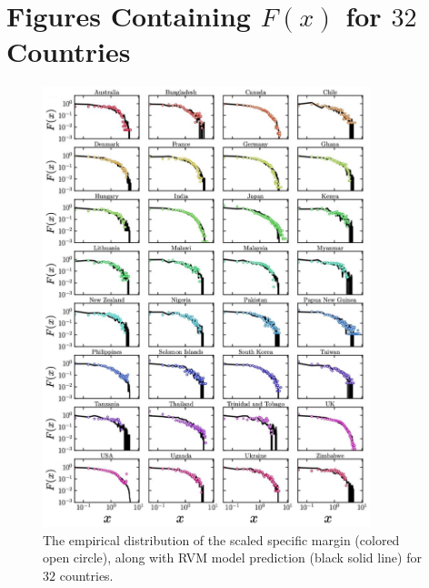 \documentclass[reprint,aps,prl,showpacs,twocolumn, superscriptaddress]{revtex4-2}
\begin{document}
\section{Figures Containing $F\left(x\right)$ for $32$ Countries}
\begin{figure}[h!]
    \includegraphics[width=0.85\textwidth]{fig_5_supp.pdf}
    \caption{The empirical distribution of the scaled specific margin (colored open circle), along with RVM model prediction (black solid line) for $32$ countries.}
    \label{fig_sup_5}
\end{figure}

\newpage
\end{document}
